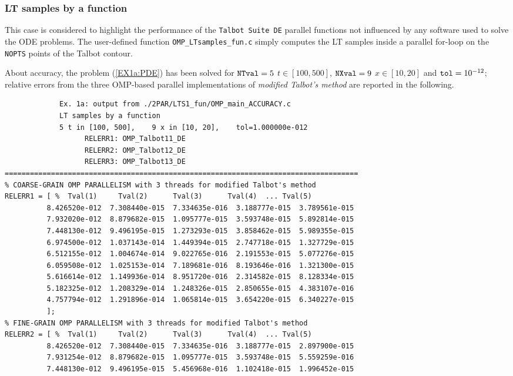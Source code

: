 \documentclass[a4paper,10pt]{report}%
\begin{document}
\subsubsection{LT samples by a function}
This case is considered to highlight the performance of the {\tt Talbot Suite DE} parallel functions not influenced by any software used to solve the ODE problems. The user-defined function
{\tt OMP\_LTsamples\_fun.c} simply computes the LT samples inside a parallel for-loop on the {\tt NOPTS} points of
the Talbot contour.

About accuracy, the problem (\ref{EX1a:PDE}) has been solved for ${\tt NTval}=5$ $t\in[100, 500]$, ${\tt NXval}=9$
$x\in[10,20]$ and ${\tt tol}=10^{-12}$; relative errors from the three OMP-based parallel implementations of
{\em modified Talbot's method} are reported in the following.
\begin{lstlisting}
             Ex. 1a: output from ./2PAR/LTS1_fun/OMP_main_ACCURACY.c
             LT samples by a function
             5 t in [100, 500],    9 x in [10, 20],    tol=1.000000e-012
                   RELERR1: OMP_Talbot11_DE
                   RELERR2: OMP_Talbot12_DE
                   RELERR3: OMP_Talbot13_DE
====================================================================================
% COARSE-GRAIN OMP PARALLELISM with 3 threads for modified Talbot's method
RELERR1 = [ %  Tval(1)     Tval(2)      Tval(3)      Tval(4)  ... Tval(5)
          8.426520e-012  7.308440e-015  7.334635e-016  3.188777e-015  3.789561e-015
          7.932020e-012  8.879682e-015  1.095777e-015  3.593748e-015  5.892814e-015
          7.448130e-012  9.496195e-015  1.273293e-015  3.858462e-015  5.989355e-015
          6.974500e-012  1.037143e-014  1.449394e-015  2.747718e-015  1.327729e-015
          6.512155e-012  1.004674e-014  9.022765e-016  2.191553e-015  5.077276e-015
          6.059508e-012  1.025153e-014  7.189681e-016  8.193646e-016  1.321300e-015
          5.616614e-012  1.149936e-014  8.951720e-016  2.314582e-015  8.128334e-015
          5.182325e-012  1.208329e-014  1.248326e-015  2.850655e-015  4.383107e-016
          4.757794e-012  1.291896e-014  1.065814e-015  3.654220e-015  6.340227e-015
          ];
% FINE-GRAIN OMP PARALLELISM with 3 threads for modified Talbot's method
RELERR2 = [ %  Tval(1)     Tval(2)      Tval(3)      Tval(4)  ... Tval(5)
          8.426520e-012  7.308440e-015  7.334635e-016  3.188777e-015  2.897900e-015
          7.931254e-012  8.879682e-015  1.095777e-015  3.593748e-015  5.559259e-016
          7.448130e-012  9.496195e-015  5.456968e-016  1.102418e-015  1.996452e-015

\end{lstlisting}
\end{document}
